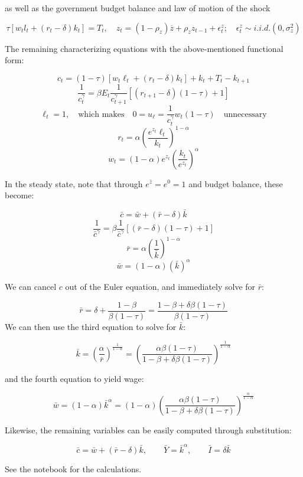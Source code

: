 \documentclass[letterpaper,12pt]{article}
\theoremstyle{definition}
\begin{document}
\begin{spacing}{1.5}
as well as the government budget balance and law of motion of the shock

$$ \tau [w_tl_t + (r_t - \delta)k_t] = T_t, \quad z_t = ( 1 - \rho_z )\overline{z} + \rho_z z_{t - 1} + \epsilon_t^z; \quad \epsilon_t^z \sim i.i.d.(0, \sigma_z^2)$$

The remaining characterizing equations with the above-mentioned functional form:

$$c_t = (1 - \tau)[w_t\ell_t + (r_t - \delta) k_t] + k_t + T_t - k_{t + 1} $$
$$\frac{1}{c_t^\gamma} = \beta E_t{\frac{1}{c_{t + 1}^\gamma} [ (r_{t + 1} -\delta)(1 - \tau) + 1]} $$
$$ \ell_t = 1, \quad \text{which makes} \quad 0 = u_{\ell} = \frac{1}{c_t^\gamma} w_t (1 - \tau) \quad \text{unnecessary}$$
$$r_t = \alpha (\frac{ e^{z_t} \ell_t}{k_t})^{1 - \alpha} $$
$$ w_t = (1 - \alpha) e^{z_t} (\frac{k_t}{e^{z_t}})^\alpha$$

In the steady state, note that through $e^{\bar{z}} = e^0 = 1$ and budget balance, these become:

$$\bar{c} = \bar{w} + (\bar{r} - \delta) \bar{k}$$
$$\frac{1}{\bar{c}^\gamma} = \beta {\frac{1}{\bar{c}^\gamma} [(\bar{r} -\delta)(1 - \tau) + 1]} $$
$$\bar{r} = \alpha (\frac{1}{\bar{k}})^{1 - \alpha} $$
$$\bar{w} = (1 - \alpha) (\bar{k})^\alpha$$

We can cancel $c$ out of the Euler equation, and immediately solve for $\bar{r}$:

$$\bar{r} = \delta + \frac{1 - \beta}{\beta(1 -\tau)} = \frac{1 - \beta + \delta \beta(1 -\tau)}{\beta(1 -\tau)} $$
We can then use the third equation to solve for $\bar{k}$:

$$\bar{k} = (\frac{\alpha}{\bar{r}} )^{\frac{1}{1 - \alpha}} =(\frac{\alpha \beta(1 -\tau)}{1 - \beta + \delta \beta(1 -\tau)} )^{\frac{1}{1 - \alpha}} $$

and the fourth equation to yield wage:

$$\bar{w} = (1 - \alpha) \bar{k}^{\alpha} = (1 - \alpha)(\frac{\alpha \beta(1 -\tau)}{1 - \beta + \delta \beta(1 -\tau)} )^{\frac{\alpha}{1 - \alpha}} $$

Likewise, the remaining variables can be easily computed through substitution:

$$ \bar{c} = \bar{w} + (\bar{r} - \delta) \bar{k}, \qquad 
\bar{Y} = \bar{k}^\alpha, \qquad 
\bar{I} = \delta \bar{k} $$

See the notebook for the calculations.



\end{spacing}
\end{document}
